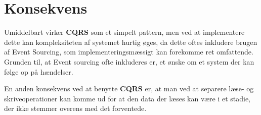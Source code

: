 \section{Konsekvens}
Umiddelbart virker \textbf{CQRS} som et simpelt pattern, men ved at implementere dette kan kompleksiteten af systemet hurtig øges, da dette oftes inkludere brugen af Event Sourcing, som implementeringsmæssigt kan forekomme ret omfattende. Grunden til, at Event sourcing ofte inkluderes er, et ønske om et system der kan følge op på hændelser.

En anden konsekvens ved at benytte \textbf{CQRS} er, at man ved at separere læse- og skriveoperationer kan komme ud for at den data der læses kan være i et stadie, der ikke stemmer overens med det forventede.

